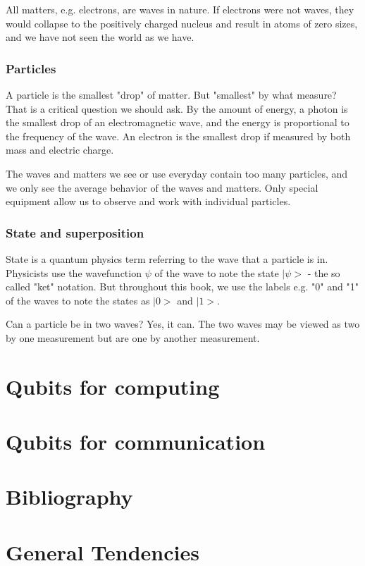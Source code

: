 \documentclass{book}
\begin{document}
All matters, e.g. electrons, are waves in nature. If electrons were not waves, they would collapse to the positively charged nucleus and result in atoms of zero sizes, and we have not seen the world as we have.

\subsection{Particles}
A particle is the smallest "drop" of matter. But "smallest" by what measure? That is a critical question we should ask. By the amount of energy, a photon is the smallest drop of an electromagnetic wave, and the energy is proportional to the frequency of the wave. An electron is the smallest drop if measured by both mass and electric charge.

The waves and matters we see or use everyday contain too many particles, and we only see the average behavior of the waves and matters. Only special equipment allow us to observe and work with individual particles.

\subsection{State and superposition}
State is a quantum physics term referring to the wave that a particle is in. Physicists use the wavefunction $\psi$ of the wave to note the state $|\psi>$ - the so called "ket" notation. But throughout this book, we use the labels e.g. "0" and "1" of the waves to note the states as $|0>$ and $|1>$. 

Can a particle be in two waves? Yes, it can. The two waves may be viewed as two by one measurement but are one by another measurement. 

\chapter{Qubits for computing}
\chapter{Qubits for communication}
\chapter{Bibliography}
\chapter{General Tendencies}

\backmatter
{}
\printindex
\end{document}
